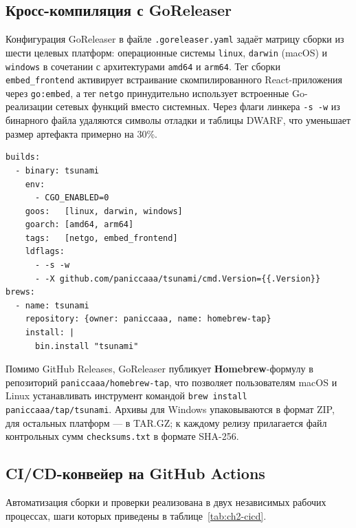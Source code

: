 \subsection*{Кросс-компиляция с GoReleaser}

Конфигурация GoReleaser в файле \texttt{.goreleaser.yaml} задаёт матрицу сборки из шести целевых платформ: операционные системы \texttt{linux}, \texttt{darwin} (macOS) и \texttt{windows} в сочетании с архитектурами \texttt{amd64} и \texttt{arm64}.
Тег сборки \texttt{embed\_frontend} активирует встраивание скомпилированного React-приложения через \texttt{go:embed}, а тег \texttt{netgo} принудительно использует встроенные Go-реализации сетевых функций вместо системных.
Через флаги линкера \texttt{-s -w} из бинарного файла удаляются символы отладки и таблицы DWARF, что уменьшает размер артефакта примерно на 30\%.

\begin{lstlisting}[caption={Ключевые блоки конфигурации GoReleaser (\texttt{.goreleaser.yaml})},label={lst:goreleaser}]
builds:
  - binary: tsunami
    env:
      - CGO_ENABLED=0
    goos:   [linux, darwin, windows]
    goarch: [amd64, arm64]
    tags:   [netgo, embed_frontend]
    ldflags:
      - -s -w
      - -X github.com/paniccaaa/tsunami/cmd.Version={{.Version}}
brews:
  - name: tsunami
    repository: {owner: paniccaaa, name: homebrew-tap}
    install: |
      bin.install "tsunami"
\end{lstlisting}

Помимо GitHub Releases, GoReleaser публикует \textbf{Homebrew}-формулу в репозиторий \texttt{paniccaaa/homebrew-tap}, что позволяет пользователям macOS и Linux устанавливать инструмент командой \texttt{brew install paniccaaa/tap/tsunami}.
Архивы для Windows упаковываются в формат ZIP, для остальных платформ --- в TAR.GZ; к каждому релизу прилагается файл контрольных сумм \texttt{checksums.txt} в формате SHA-256.

\subsection*{CI/CD-конвейер на GitHub Actions}

Автоматизация сборки и проверки реализована в двух независимых рабочих процессах, шаги которых приведены в таблице~\ref{tab:ch2-cicd}.

